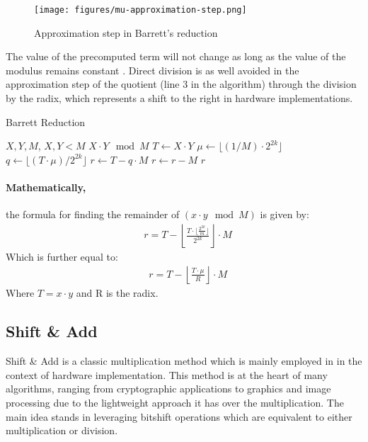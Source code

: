 \documentclass[11pt,
  titlepage=false,
  abstract=on,
]{scrreprt}
\begin{document}
\begin{figure}[h]
  \centering
  \texttt{[image: figures/mu-approximation-step.png]}
  \caption{Approximation step in Barrett's reduction \cite{ModArith}}
  \label{fig:ApproximationStepBarrett}
\end{figure}
\newpage
The value of the precomputed term will not change as long as the value of the modulus remains constant \cite{4272869}.
Direct division is as well avoided in the approximation step of the quotient (line 3 in the algorithm) through the division by the radix, which represents a shift to the right in hardware implementations.

\begin{algorithm}
  \caption{Barrett Reduction}
  \label{alg:montgomery}
  \begin{algorithmic}[1]
  \REQUIRE \( X, Y, M \), \( X, Y < M \)
  \renewcommand{\algorithmicensure}{\textbf{Output:}}
  \ENSURE \(X \cdot Y \mod M \)
  \STATE \( T \leftarrow X \cdot Y \)
  \STATE \( \mu \leftarrow \lfloor(1 / M) \cdot 2^{2k}\rfloor \)
  \STATE \( q \leftarrow \lfloor (T \cdot \mu) / 2^{2k} \rfloor \)
  \STATE \( r \leftarrow T - q \cdot M \)
      \STATE \( r \leftarrow r - M \)
  \ENDIF
  \RETURN \( r \)
  \end{algorithmic}
\end{algorithm}
\paragraph{Mathematically,} the formula for finding the remainder of $(x \cdot y \mod M)$ is given by:
\begin{align*}
  &r = T - \left\lfloor \frac{T \cdot \lfloor \frac{2^{2k}}{m}\rfloor}{2^{2k}} \right\rfloor \cdot M
\end{align*}
Which is further equal to:
\begin{align*}
  &r = T - \left\lfloor \frac{T \cdot \mu}{R} \right\rfloor \cdot M
\end{align*}
Where $T = x \cdot y$ and R is the radix.

\subsection{Shift \& Add}
Shift \& Add is a classic multiplication method which is mainly employed in in the context of hardware implementation.
This method is at the heart of many algorithms, ranging from cryptographic applications to graphics and image processing due to the lightweight
approach it has over the multiplication. The main idea stands in leveraging bitshift operations which are equivalent to either multiplication or division.
\end{document}
